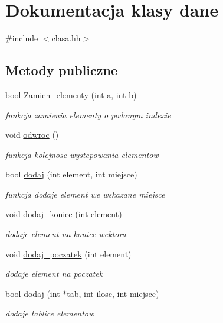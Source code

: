 \hypertarget{classdane}{\section{\-Dokumentacja klasy dane}
\label{classdane}
}


{\ttfamily \#include $<$clasa.\-hh$>$}

\subsection*{\-Metody publiczne}
\begin{DoxyCompactItemize}
\item 
bool \hyperlink{classdane_a09b0fdc6cf2fa99c6c2f68d4c0030744}{\-Zamien\-\_\-elementy} (int a, int b)
\begin{DoxyCompactList}\small\item\em funkcja zamienia elementy o podanym indexie \end{DoxyCompactList}\item 
void \hyperlink{classdane_ae749fc29f90e1319e2ce90ad4468c493}{odwroc} ()
\begin{DoxyCompactList}\small\item\em funkcja kolejnosc wystepowania elementow \end{DoxyCompactList}\item 
bool \hyperlink{classdane_a5e78dfce6c067184fcab87fc240c1aae}{dodaj} (int element, int miejsce)
\begin{DoxyCompactList}\small\item\em funkcja dodaje element we wskazane miejsce \end{DoxyCompactList}\item 
void \hyperlink{classdane_a7bcc9aec78734af1ee645dc9ebe1287b}{dodaj\-\_\-koniec} (int element)
\begin{DoxyCompactList}\small\item\em dodaje element na koniec wektora \end{DoxyCompactList}\item 
void \hyperlink{classdane_ad44c49c93a1eae29da38e0392a45f44d}{dodaj\-\_\-poczatek} (int element)
\begin{DoxyCompactList}\small\item\em dodaje element na poczatek \end{DoxyCompactList}\item 
bool \hyperlink{classdane_aff5590550b2314aad3112910d8d53a26}{dodaj} (int $\ast$tab, int ilosc, int miejsce)
\begin{DoxyCompactList}\small\item\em dodaje tablice elementow \end{DoxyCompactList}\item 

\end{DoxyCompactItemize}
